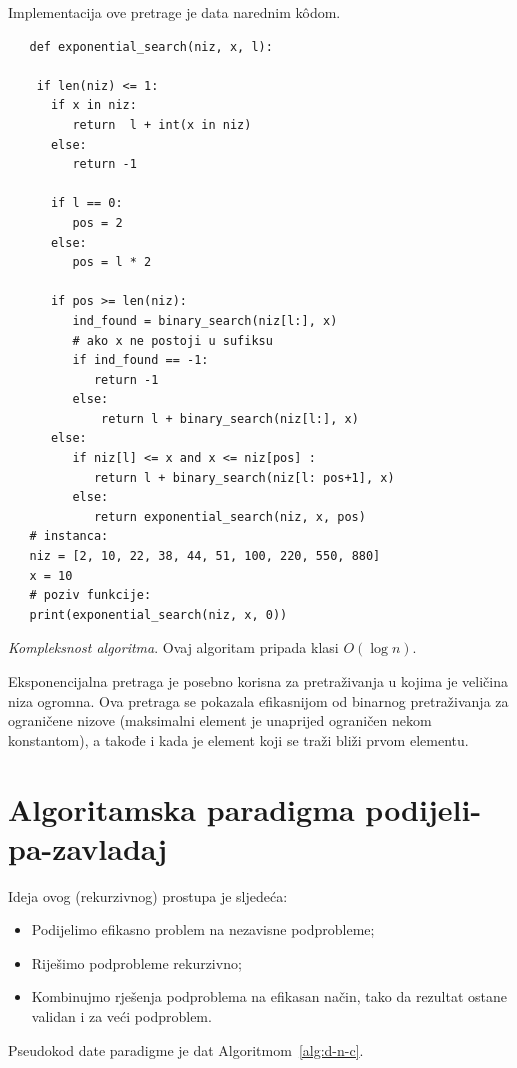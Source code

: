    Implementacija ove pretrage je data narednim k\^odom. 
   
   \begin{verbatim}
   def exponential_search(niz, x, l):
   
   	if len(niz) <= 1:
   	  if x in niz:
   		 return  l + int(x in niz)
   	  else:
  		 return -1 
   
   	  if l == 0:
   		 pos = 2
   	  else:
   		 pos = l * 2
   
   	  if pos >= len(niz):
   		 ind_found = binary_search(niz[l:], x)
		 # ako x ne postoji u sufiksu
   		 if ind_found == -1:  
   			return -1
   		 else:
   			 return l + binary_search(niz[l:], x)
   	  else:
   		 if niz[l] <= x and x <= niz[pos] :
   		    return l + binary_search(niz[l: pos+1], x)
   		 else:
   		    return exponential_search(niz, x, pos)
   # instanca:
   niz = [2, 10, 22, 38, 44, 51, 100, 220, 550, 880]
   x = 10
   # poziv funkcije: 
   print(exponential_search(niz, x, 0))
   \end{verbatim}

\textit{Kompleksnost algoritma}.  Ovaj algoritam pripada klasi $O(\log n)$. 
 

Eksponencijalna pretraga je posebno korisna za pretraživanja u kojima je  veličina niza ogromna.  Ova pretraga se pokazala efikasnijom   od binarnog pretraživanja za ograničene nizove (maksimalni element je unaprijed ograničen nekom konstantom), a takođe i kada je element koji se traži bliži prvom elementu.

\section{Algoritamska paradigma podijeli-pa-zavladaj}
Ideja ovog (rekurzivnog) prostupa je sljedeća:
\begin{itemize}
	\item  Podijelimo efikasno problem   na nezavisne podprobleme;
	\item Riješimo podprobleme rekurzivno;
	\item  Kombinujmo rješenja podproblema na efikasan način, tako da rezultat ostane validan i za veći podproblem.
\end{itemize}

Pseudokod date paradigme je dat  Algoritmom~\ref{alg:d-n-c}. 

  

